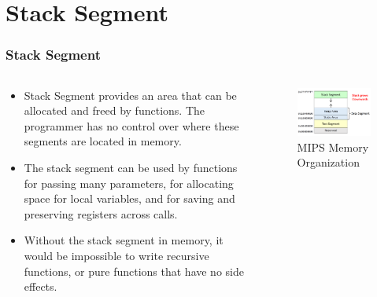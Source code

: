 \documentclass[
	10pt, %
	hmargin=1cm,vmargin=0cm,head=0.5cm,headsep=0pt,foot=0.5cm,margin=2cm
]{beamer}
\begin{document}
\section{Stack Segment}
\begin{frame}
	\frametitle{Stack Segment}
	\begin{columns}[c]
		\begin{column}{0.6\textwidth}
			\begin{itemize}
				\item Stack Segment provides an area that can be allocated and freed by functions. The programmer has no control over where these segments are located in memory. \pause
				\item The stack segment can be used by functions for passing many parameters, for allocating space for local variables, and for saving and preserving registers across calls. \pause
				\item Without the stack segment in memory, it would be impossible to write recursive functions, or pure functions that have no side effects. \pause
			\end{itemize}
		\end{column}
		\begin{column}{0.4\textwidth}
			\begin{figure}
				\includegraphics[width=\linewidth]{mips_memory_stack.png}
				\caption{MIPS Memory Organization}
			\end{figure}
		\end{column}
	\end{columns}
\end{frame}
\end{document}
